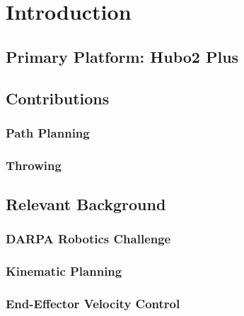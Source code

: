 \chapter{Introduction}
	
	\section{Primary Platform: Hubo2 Plus}\label{sec:hubo}
			
	\section{Contributions}\label{sec:contributions}
		
		\subsection{Path Planning}\label{sec:srm}
		
		

		\subsection{Throwing}\label{sec:baseball}
		
		
		
%		
		
	\section{Relevant Background}\label{sec:background}
    		
    	\subsection{DARPA Robotics Challenge}\label{sec:drc}
    	    
		\subsection{Kinematic Planning}
			
		\subsection{End-Effector Velocity Control}
			
%			
